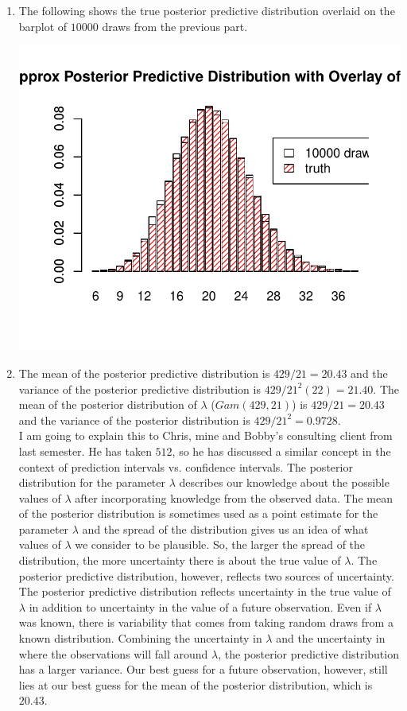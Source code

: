 \documentclass[12pt]{article}\usepackage[]{graphicx}\usepackage[]{color}
\newenvironment{knitrout}{}{} %
\begin{document}
\begin{doublespacing}
\begin{enumerate}
\begin{center}
\begin{knitrout}
\end{knitrout}
\end{center}

\item The following shows the true posterior predictive distribution overlaid on the barplot of $10000$ draws from the previous part. 
\begin{center}
\begin{knitrout}\footnotesize
{}\color{fgcolor}
\includegraphics[width=.5\linewidth]{figure/postpreddraws2-1} 

\end{knitrout}
\end{center}

\item The mean of the posterior predictive distribution is $429/21 = 20.43$ and the variance of the posterior predictive distribution is $429/21^2(22) = 21.40$. The mean of the posterior distribution of $\lambda$ ($Gam(429, 21)$) is $429/21 = 20.43$ and the variance of the posterior distribution is $429/21^2 = 0.9728$.\\

I am going to explain this to Chris, mine and Bobby's consulting client from last semester. He has taken $512$, so he has discussed a similar concept in the context of prediction intervals vs. confidence intervals. The posterior distribution for the parameter $\lambda$ describes our knowledge about the possible values of $\lambda$ after incorporating knowledge from the observed data. The mean of the posterior distribution is sometimes used as a point estimate for the parameter $\lambda$ and the spread of the distribution gives us an idea of what values of $\lambda$ we consider to be plausible. So, the larger the spread of the distribution, the more uncertainty there is about the true value of $\lambda$. The posterior predictive distribution, however, reflects two sources of uncertainty. The posterior predictive distribution reflects uncertainty in the true value of $\lambda$ in addition to uncertainty in the value of a future observation. Even if $\lambda$ was known, there is variability that comes from taking random draws from a known distribution. Combining the uncertainty in $\lambda$ and the uncertainty in where the observations will fall around $\lambda$, the posterior predictive distribution has a larger variance. Our best guess for a future observation, however, still lies at our best guess for the mean of the posterior distribution, which is $20.43$.


\end{enumerate}
\end{doublespacing}
\end{document}

